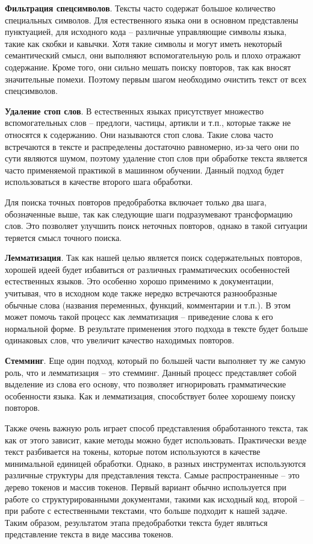 \documentclass[14pt]{matmex-diploma-custom}
\begin{document}
\textbf{Фильтрация спецсимволов}. Тексты часто содержат большое количество специальных символов. Для естественного языка они в основном представлены пунктуацией, для исходного кода -- различные управляющие символы языка, такие как скобки и кавычки. Хотя такие символы и могут иметь некоторый семантический смысл, они выполняют вспомогательную роль и плохо отражают содержание. Кроме того, они сильно мешать поиску повторов, так как вносят значительные помехи. Поэтому первым шагом необходимо очистить текст от всех спецсимволов.

\textbf{Удаление стоп слов}. В естественных языках присутствует множество вспомогательных слов -- предлоги, частицы, артикли и т.п., которые также не относятся к содержанию. Они называются стоп слова. Такие слова часто встречаются в тексте и распределены достаточно равномерно, из-за чего они по сути являются шумом, поэтому удаление стоп слов при обработке текста является часто применяемой практикой в машинном обучении. Данный подход будет использоваться в качестве второго шага обработки.

Для поиска точных повторов предобработка включает только два шага, обозначенные выше, так как следующие шаги подразумевают трансформацию слов. Это позволяет улучшить поиск неточных повторов, однако в такой ситуации теряется смысл точного поиска.

\textbf{Лемматизация}. Так как нашей целью является поиск содержательных повторов, хорошей идеей будет избавиться от различных грамматических особенностей естественных языков. Это особенно хорошо применимо к документации, учитывая, что в исходном коде также нередко встречаются разнообразные обычные слова (названия переменных, функций, комментарии и т.п.). В этом может помочь такой процесс как лемматизация -- приведение слова к его нормальной форме. В результате применения этого подхода в тексте будет больше одинаковых слов, что увеличит качество находимых повторов.

\textbf{Стемминг}. Еще один подход, который по большей части выполняет ту же самую роль, что и лемматизация -- это стемминг. Данный процесс представляет собой выделение из слова его основу, что позволяет игнорировать грамматические особенности языка. Как и лемматизация, способствует более хорошему поиску повторов.

Также очень важную роль играет способ представления обработанного текста, так как от этого зависит, какие методы можно будет использовать. Практически везде текст разбивается на токены, которые потом используются в качестве минимальной единицей обработки. Однако, в разных инструментах используются различные структуры для представления текста. Самые распространенные -- это дерево токенов и массив токенов. Первый вариант обычно используется при работе со структурированными документами, такими как исходный код, второй -- при работе с естественными текстами, что больше подходит к нашей задаче. Таким образом, результатом этапа предобработки текста будет являться представление текста в виде массива токенов.
\end{document}
